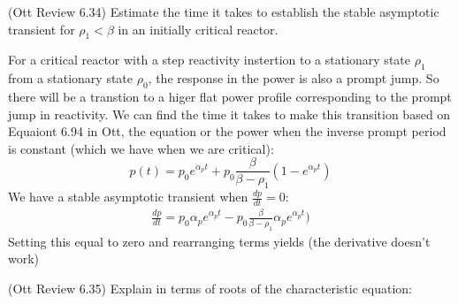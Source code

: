 \documentclass[11pt,addpoints,answers]{exam}
\begin{document}
\begin{questions}
        \question (Ott Review 6.34) Estimate the time it takes to establish the 
        stable asymptotic transient for $\rho_1 < \beta$ in an initially 
        critical reactor.
                \begin{solution}
                    For a critical reactor with a step reactivity instertion to
                    a stationary state $\rho_{1}$ from a stationary state
                    $\rho_{0}$, the response in the power is also a prompt jump.
                    So there will be a transtion to a higer flat power
                    profile corresponding to the prompt jump in reactivity. We
                    can find the time it takes to make this transition based on
                    Equaiont 6.94 in Ott, the equation or the power when the
                    inverse prompt period is constant (which we have when we are
                    critical):
                    \begin{equation}
                        p(t) = p_0 e^{\alpha_{p} t} + p_0 \frac{\beta}{\beta -
                        \rho_1} (1 - e^{\alpha_{p} t})
                    \end{equation}
                    We have a stable asymptotic transient when $\frac{dp}{dt} =
                    0$:
                    \begin{align*}
                        \frac{dp}{dt} = p_0 \alpha_p e^{\alpha_p t} - p_0 \frac{\beta}{\beta -
                        \rho_1} \alpha_{p} e^{\alpha_{p} t})
                    \end{align*}
                    Setting this equal to zero and rearranging terms yields
                    (the derivative doesn't work)
                \end{solution}


        \question[10] (Ott Review 6.35) Explain in terms of roots of the 
        characteristic equation:
\end{questions}
\end{document}

